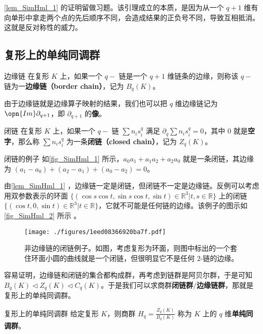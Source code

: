 \autoref{lem_SimHml_1} 的证明留做习题。该引理成立的本质，是因为从一个 $q+1$ 维有向单形中拿走两个点的先后顺序不同，会造成结果的正负号不同，导致互相抵消。这就是反对称性的威力。


\subsection{复形上的单纯同调群}


\begin{definition}{边缘链}
在复形 $K$ 上，如果一个 $q-$ 链是一个 $q+1$ 维链条的边缘，则称该 $q-$ 链为一\textbf{边缘链（border chain）}，记为 $B_q(K)$。
\end{definition}

由于边缘链就是边缘算子映射的结果，我们也可以把 $q$ 维边缘链记为 $\opn{Im}\partial_{q+1}$，即 $\partial_{q+1}$ 的\textbf{像}。

\begin{definition}{闭链}
在复形 $K$ 上，如果一个 $q-$ 链 $\sum n_is^q_i$ 满足 $\partial_q\sum n_is^q_i=0$，其中 $0$ 就是\textbf{空字}，那么称 $\sum n_is^q_i$ 为一条\textbf{闭链（closed chain）}，记为 $Z_q(K)$。
\end{definition}

\begin{example}{闭链的例子}
如\autoref{fig_SimHml_1} 所示，$a_0a_1+a_1a_2+a_2a_0$ 就是一条闭链，其边缘为 $(a_1-a_0)+(a_2-a_1)+(a_0-a_2)=0$。
\end{example}

由\autoref{lem_SimHml_1} ，边缘链一定是闭链，但闭链不一定是边缘链。反例可以考虑用双参数表示的环面 $\{(\cos s\cos t, \sin s\cos t, \sin t)\in\mathbb{R}^3|t, s\in\mathbb{R}\}$ 上的闭链 $\{(\cos t, 0, \sin t)\in\mathbb{R}^3|t\in\mathbb{R}\}$，它就不可能是任何链的边缘。该例子的图示如\autoref{fig_SimHml_2} 所示 。


\begin{figure}[ht]
\centering
\texttt{[image: ./figures/1eed08366920ba7f.pdf]}
\caption{非边缘链的闭链例子。如图，考虑复形为环面，则图中标出的一个套住环面小圆的曲线就是一个闭链，但很明显它不是任何 $2$-链的边缘。} \label{fig_SimHml_2}
\end{figure}




容易证明，边缘链和闭链的集合都构成群，再考虑到链群是阿贝尔群，于是可知 $B_q(K)\triangleleft Z_q(K)\triangleleft C_q(K)$。于是我们可以求商群\textbf{闭链群}$/$\textbf{边缘链群}，那就是复形上的单纯同调群。


\begin{definition}{复形上的单纯同调群}
给定复形 $K$，则商群 $H_q=\frac{Z_q(K)}{B_q(K)}$ 称为 $K$ 上的 $q$ 维\textbf{单纯同调群}。
\end{definition}